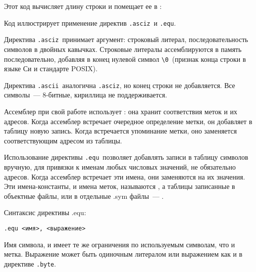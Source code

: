 \secup

\secdown

Этот код вычисляет длину строки и помещает ее в :


Код иллюстрирует применение директив \verb|.asciz|\ и \verb|.equ|.


Директива \verb|.asciz|\ принимает аргумент: строковый литерал,
последовательность символов в двойных кавычках. Строковые литералы
ассемблируются в память последовательно, добавляя в конец нулевой символ
\verb|\0|\ (признак конца строки в языке Си и стандарте POSIX).

Директива \verb|.ascii|\ аналогична \verb|.asciz|, но конец строки не
добавляется. Все символы\ --- 8-битные, кириллица не поддерживается.


Ассемблер при свой работе использует : она хранит соответствия меток и их адресов. Когда ассемблер встречает
очередное определение метки, он добавляет в таблицу новую запись. Когда
встречается упоминание метки, оно заменяется соответствующим адресом из
таблицы.

Использование директивы \verb|.equ|\ позволяет добавлять записи в
таблицу символов вручную, для привязки к именам любых числовых значений, не
обязательно адресов. Когда ассемблер встречает эти имена, они заменяются на их
значения. Эти имена-константы, и имена меток, называются
, а таблицы записанные в объектные файлы, или в
отдельные .sym файлы\ --- .

Синтаксис директивы .equ:

\begin{verbatim}
.equ <имя>, <выражение>
\end{verbatim}

Имя символа, и имеет те же ограничения по используемым символам, что и метка.
Выражение может быть одиночным литералом или выражением как и в директиве
\verb|.byte|.

